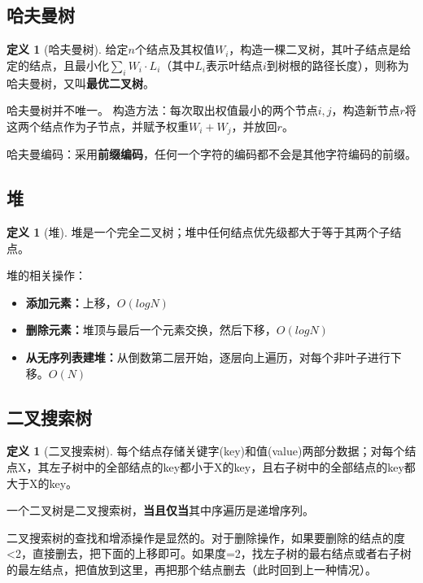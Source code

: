 \documentclass[hyperref,a4paper,UTF8,12pt]{ctexart}
\theoremstyle{definition}
\newtheorem{definition}[theorem]{定义}
\begin{document}
\subsection{哈夫曼树}
\begin{definition}[哈夫曼树]
    给定$n$个结点及其权值$W_i$，构造一棵二叉树，其叶子结点是给定的结点，且最小化$\sum_i W_i\cdot L_i$（其中$L_i$表示叶结点$i$到树根的路径长度），则称为哈夫曼树，又叫\textbf{最优二叉树}。
\end{definition}
哈夫曼树并不唯一。
构造方法：每次取出权值最小的两个节点$i,j$，构造新节点$r$将这两个结点作为子节点，并赋予权重$W_i+W_j$，并放回$r$。

哈夫曼编码：采用\textbf{前缀编码}，任何一个字符的编码都不会是其他字符编码的前缀。

\subsection{堆}
\begin{definition}[堆]
    堆是一个完全二叉树；堆中任何结点优先级都大于等于其两个子结点。
\end{definition}
堆的相关操作：
\begin{itemize}
    \item \textbf{添加元素：}上移，$O(logN)$
    \item \textbf{删除元素：}堆顶与最后一个元素交换，然后下移，$O(logN)$
    \item \textbf{从无序列表建堆：}从倒数第二层开始，逐层向上遍历，对每个非叶子进行下移。$O(N)$
\end{itemize}

\subsection{二叉搜索树}
\begin{definition}[二叉搜索树]
    每个结点存储关键字(key)和值(value)两部分数据；对每个结点X，其左子树中的全部结点的key都小于X的key，且右子树中的全部结点的key都大于X的key。
\end{definition}
一个二叉树是二叉搜索树，\textbf{当且仅当}其中序遍历是递增序列。

二叉搜索树的查找和增添操作是显然的。对于删除操作，如果要删除的结点的度<2，直接删去，把下面的上移即可。如果度=2，找左子树的最右结点或者右子树的最左结点，把值放到这里，再把那个结点删去（此时回到上一种情况）。
\end{document}
